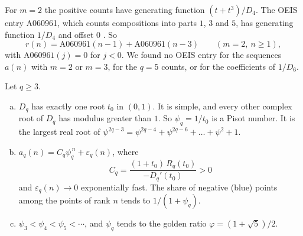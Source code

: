 For $m=2$ the positive counts have generating function $(t+t^3)/D_4$. The OEIS entry A060961, which
counts compositions into parts $1$, $3$ and $5$, has generating function $1/D_4$ and offset $0$
\cite{oeisA060961}. So
\[
r(n)=\mathrm{A060961}(n-1)+\mathrm{A060961}(n-3)\qquad(m=2,\ n\ge1),
\]
with $\mathrm{A060961}(j)=0$ for $j<0$. We found no OEIS entry for the sequences $a(n)$ with $m=2$ or
$m=3$, for the $q=5$ counts, or for the coefficients of $1/D_6$.

\begin{proposition}[growth]\label{prop:growth}
Let $q\ge3$.
\begin{enumerate}[(a)]
\item $D_q$ has exactly one root $t_0$ in $(0,1)$. It is simple, and every other complex root of $D_q$
has modulus greater than $1$. So $\psi_q=1/t_0$ is a Pisot number. It is the largest real root of
$\psi^{2q-3}=\psi^{2q-4}+\psi^{2q-6}+\dots+\psi^2+1$.
\item $a_q(n)=C_q\psi_q^{\,n}+\varepsilon_q(n)$, where
\[
C_q=\frac{(1+t_0)\,R_q(t_0)}{-D_q'(t_0)}>0
\]
and $\varepsilon_q(n)\to0$ exponentially fast. The share of negative (blue) points among the points of
rank $n$ tends to $1/(1+\psi_q)$.
\item $\psi_3<\psi_4<\psi_5<\cdots$, and $\psi_q$ tends to the golden ratio $\varphi=(1+\sqrt5)/2$.
\end{enumerate}
\end{proposition}

